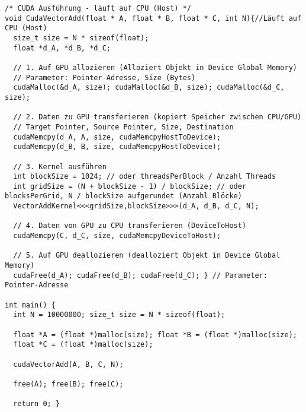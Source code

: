 \begin{lstlisting}
/* CUDA Ausführung - läuft auf CPU (Host) */
void CudaVectorAdd(float * A, float * B, float * C, int N){//Läuft auf CPU (Host)
  size_t size = N * sizeof(float);
  float *d_A, *d_B, *d_C;

  // 1. Auf GPU allozieren (Alloziert Objekt in Device Global Memory)
  // Parameter: Pointer-Adresse, Size (Bytes)
  cudaMalloc(&d_A, size); cudaMalloc(&d_B, size); cudaMalloc(&d_C, size);

  // 2. Daten zu GPU transferieren (kopiert Speicher zwischen CPU/GPU)
  // Target Pointer, Source Pointer, Size, Destination
  cudaMemcpy(d_A, A, size, cudaMemcpyHostToDevice);
  cudaMemcpy(d_B, B, size, cudaMemcpyHostToDevice);

  // 3. Kernel ausführen
  int blockSize = 1024; // oder threadsPerBlock / Anzahl Threads
  int gridSize = (N + blockSize - 1) / blockSize; // oder blocksPerGrid, N / blockSize aufgerundet (Anzahl Blöcke)
  VectorAddKernel<<<gridSize,blockSize>>>(d_A, d_B, d_C, N);

  // 4. Daten von GPU zu CPU transferieren (DeviceToHost)
  cudaMemcpy(C, d_C, size, cudaMemcpyDeviceToHost);

  // 5. Auf GPU deallozieren (dealloziert Objekt in Device Global Memory)
  cudaFree(d_A); cudaFree(d_B); cudaFree(d_C); } // Parameter: Pointer-Adresse

int main() {
  int N = 10000000; size_t size = N * sizeof(float);

  float *A = (float *)malloc(size); float *B = (float *)malloc(size);
  float *C = (float *)malloc(size);

  cudaVectorAdd(A, B, C, N);

  free(A); free(B); free(C);

  return 0; }
\end{lstlisting}

